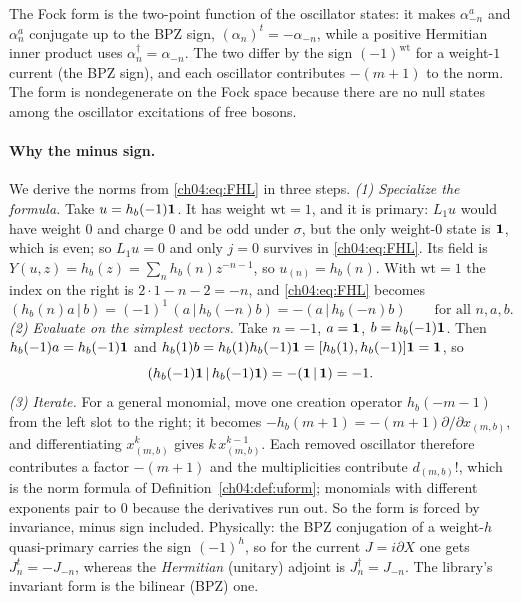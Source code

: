 \begin{physics}
The Fock form is the two-point function of the oscillator states: it makes $\alpha^a_{-n}$ and $\alpha^a_n$ conjugate up to the BPZ sign, $(\alpha_n)^t=-\alpha_{-n}$, while a positive Hermitian inner product uses $\alpha_n^\dagger=\alpha_{-n}$. The two differ by the sign $(-1)^{\mathrm{wt}}$ for a weight-$1$ current (the BPZ sign), and each oscillator contributes $-(m+1)$ to the norm. The form is nondegenerate on the Fock space because there are no null states among the oscillator excitations of free bosons.
\end{physics}

\paragraph{Why the minus sign.} We derive the norms from \eqref{ch04:eq:FHL} in three steps.
\emph{(1) Specialize the formula.} Take $u=h_b(-1)\mathbf{1}$. It has weight $\mathrm{wt}=1$, and it
is primary: $L_1u$ would have weight $0$ and charge $0$ and be odd under $\sigma$, but the only
weight-$0$ state is $\mathbf{1}$, which is even; so $L_1u=0$ and only $j=0$ survives in
\eqref{ch04:eq:FHL}. Its field is $Y(u,z)=h_b(z)=\sum_nh_b(n)z^{-n-1}$, so $u_{(n)}=h_b(n)$. With
$\mathrm{wt}=1$ the index on the right is $2\cdot1-n-2=-n$, and \eqref{ch04:eq:FHL} becomes
\begin{equation*}
  (h_b(n)a\,|\,b)=(-1)^1\,(a\,|\,h_b(-n)b)=-(a\,|\,h_b(-n)b)\qquad\text{for all }n,a,b .
\end{equation*}
\emph{(2) Evaluate on the simplest vectors.} Take $n=-1$, $a=\mathbf{1}$, $b=h_b(-1)\mathbf{1}$. Then
$h_b(-1)a=h_b(-1)\mathbf{1}$ and $h_b(1)b=h_b(1)h_b(-1)\mathbf{1}=[h_b(1),h_b(-1)]\mathbf{1}=\mathbf{1}$, so
\begin{equation*}
  (h_b(-1)\mathbf{1}\,|\,h_b(-1)\mathbf{1})=-(\mathbf{1}\,|\,\mathbf{1})=-1 .
\end{equation*}
\emph{(3) Iterate.} For a general monomial, move one creation operator $h_b(-m-1)$ from the left
slot to the right; it becomes $-h_b(m+1)=-(m+1)\partial/\partial x_{(m,b)}$, and differentiating
$x_{(m,b)}^{k}$ gives $k\,x_{(m,b)}^{k-1}$. Each removed oscillator therefore contributes a factor
$-(m+1)$ and the multiplicities contribute $d_{(m,b)}!$, which is the norm formula of
Definition~\ref{ch04:def:uform}; monomials with different exponents pair to $0$ because the
derivatives run out. So the form is forced by invariance, minus sign included. Physically: the BPZ conjugation of a weight-$h$
quasi-primary carries the sign $(-1)^h$, so for the current $J=i\partial X$ one gets $J_n^t=-J_{-n}$,
whereas the \emph{Hermitian} (unitary) adjoint is $J_n^\dagger=J_{-n}$. The library's invariant form is
the bilinear (BPZ) one.

